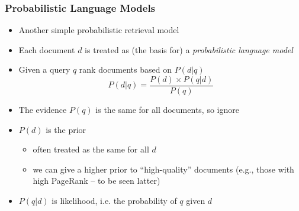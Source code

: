 \documentclass[svgnames]{beamer}
\begin{document}
\begin{frame} \frametitle{Probabilistic Language Models}
  \begin{block}{}
    \begin{itemize}
\item Another simple probabilistic retrieval model
\item Each document $d$ is treated as (the basis for) a \emph{probabilistic language model}
\item Given a query $q$ rank documents based on $P(d|q)$
\begin{equation*}
P(d|q) = \frac{P(d) \times P(q|d)}{P(q)}
\end{equation*}
\item The evidence $P(q)$ is the same for all documents, so ignore
\item $P(d)$ is the prior
\begin{itemize}
\item often treated as the same for all $d$
\item  we can give a higher prior to ``high-quality'' documents (e.g., those with high PageRank -- to be seen latter)
\end{itemize}
\item $P(q|d)$ is likelihood, i.e. the probability of $q$ given $d$
    \end{itemize}
  \end{block}

\end{frame}
\end{document}
